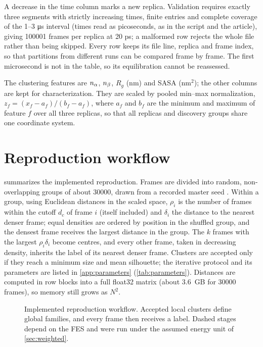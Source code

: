 A decrease in the time column marks a new replica. Validation requires exactly three segments with strictly increasing times, finite entries and complete coverage of the 1--3 μs interval (times read as picoseconds, as in the script and the article), giving \num{100001} frames per replica at 20 ps; a malformed row rejects the whole file rather than being skipped. Every row keeps its file line, replica and frame index, so that partitions from different runs can be compared frame by frame. The first microsecond is not in the table, so its equilibration cannot be reassessed.

The clustering features are $n_{\alpha}$, $n_{\beta}$, $R_g$ (nm) and SASA (nm$^2$); the other columns are kept for characterization. They are scaled by pooled min--max normalization, $z_f=(x_f-a_f)/(b_f-a_f)$, where $a_f$ and $b_f$ are the minimum and maximum of feature $f$ over all three replicas, so that all replicas and discovery groups share one coordinate system.

\section{Reproduction workflow}
 summarizes the implemented reproduction. Frames are divided into random, non-overlapping groups of about \num{30000}, drawn from a recorded master seed \autocite{numpyrng}. Within a group, using Euclidean distances in the scaled space, $\rho_i$ is the number of frames within the cutoff $d_c$ of frame $i$ (itself included) and $\delta_i$ the distance to the nearest denser frame; equal densities are ordered by position in the shuffled group, and the densest frame receives the largest distance in the group. The $k$ frames with the largest $\rho_i\delta_i$ become centres, and every other frame, taken in decreasing density, inherits the label of its nearest denser frame. Clusters are accepted only if they reach a minimum size and mean silhouette; the iterative protocol and its parameters are listed in \cref{app:parameters} (\cref{tab:parameters}). Distances are computed in row blocks into a full float32 matrix (about 3.6~GB for \num{30000} frames), so memory still grows as $N^2$.

\begin{figure}[tb]
\centering
\caption{Implemented reproduction workflow. Accepted local clusters define global families, and every frame then receives a label. Dashed stages depend on the FES and were run under the assumed energy unit of \cref{sec:weighted}.}
\label{fig:workflow}
\end{figure}

